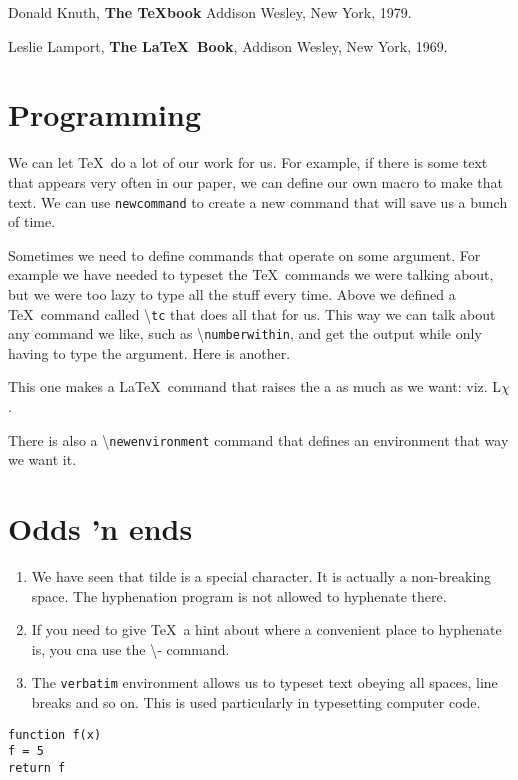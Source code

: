 \documentclass[12pt, leqno]{article}
\numberwithin{equation}{section}
\numberwithin{figure}{section}
\begin{document}
\begin{thebibliography}{XX}

Donald Knuth, \textbf{The \TeX book} Addison Wesley, New York, 1979. 

Leslie Lamport, \textbf{The \LaTeX\ Book}, Addison Wesley, New York, 1969. 
\end{thebibliography}

\section{Programming}

\newcommand{\wsu}{Washington State University}

We can let \TeX\ do a lot of our work for us. For example, if there is some text that appears very often in our 
paper, we can define our own macro to make that text. 
We can use \texttt{newcommand} to create a new command that
will save us a bunch of time. 

\newcommand{\tc}[1]{\textbackslash\texttt{#1}}

Sometimes we need to define commands that operate on some argument. For example we have needed to typeset the \TeX\ commands we were talking about, but we were too lazy to type all the stuff every time. Above we defined a \TeX\ command called \tc{tc} that does all that for us. This way we can talk about any command we like, such as \tc{numberwithin}, and get the output while only having to type the argument. Here is another. 

\newcommand{\ltx}[2]{L\raisebox{#1}{a}\raisebox{#2}{}$\chi$} 

This one makes a \LaTeX\ command that raises the a as much as we want: viz. \ltx{2pt}{-2pt}.

There is also a \tc{newenvironment} command that defines an environment that way we want it. 

\section{Odds 'n ends}

\begin{enumerate}
\item We have seen that tilde is a special character. It is actually a non-breaking space. The hyphenation program is not allowed to hyphenate there. 
\item If you need to give \TeX\ a hint about where a convenient place to hyphenate is, you cna use the \textbackslash- command. 
\item The \texttt{verbatim} environment allows us to typeset text obeying all spaces, line breaks and so on. This is used particularly in typesetting computer code. 
\end{enumerate}

\begin{verbatim}
function f(x)
f = 5 
return f
\end{verbatim}
\end{document}
